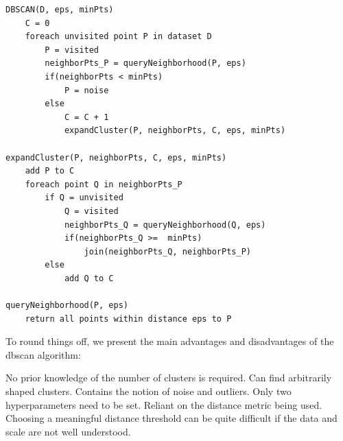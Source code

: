 \noindent \newline \begin{lstlisting}[float=hbt!, frame=tb, caption={The \gls{dbscan} algorithm.},label=lst:DBSCAN]
DBSCAN(D, eps, minPts)
    C = 0
    foreach unvisited point P in dataset D
        P = visited
        neighborPts_P = queryNeighborhood(P, eps)
        if(neighborPts < minPts)
            P = noise
        else
            C = C + 1
            expandCluster(P, neighborPts, C, eps, minPts)

expandCluster(P, neighborPts, C, eps, minPts)
    add P to C
    foreach point Q in neighborPts_P
        if Q = unvisited
            Q = visited
            neighborPts_Q = queryNeighborhood(Q, eps)
            if(neighborPts_Q >=  minPts)
                join(neighborPts_Q, neighborPts_P)
        else
            add Q to C
            
queryNeighborhood(P, eps)
    return all points within distance eps to P
\end{lstlisting}

\noindent To round things off, we present the main advantages and disadvantages of the \gls{dbscan} algorithm:

\begin{itemize}
    \pro No prior knowledge of the number of clusters is required.
    \pro Can find arbitrarily shaped clusters.
    \pro Contains the notion of noise and outliers.
    \pro Only two hyperparameters need to be set.
    \con Reliant on the distance metric being used.
    \con Choosing a meaningful distance threshold can be quite difficult if the data and scale are not well understood.
\end{itemize}

